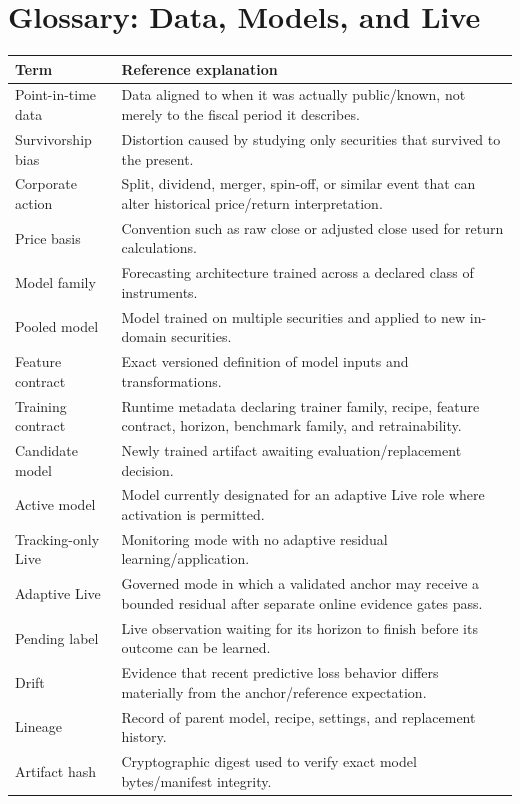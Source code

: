 \documentclass[11pt]{article}
\begin{document}
\section{Glossary: Data, Models, and Live}
\begin{longtable}{p{}p{}}
\toprule
Term & Reference explanation\\
\midrule
Point-in-time data & Data aligned to when it was actually public/known, not merely to the fiscal period it describes.\\
Survivorship bias & Distortion caused by studying only securities that survived to the present.\\
Corporate action & Split, dividend, merger, spin-off, or similar event that can alter historical price/return interpretation.\\
Price basis & Convention such as raw close or adjusted close used for return calculations.\\
Model family & Forecasting architecture trained across a declared class of instruments.\\
Pooled model & Model trained on multiple securities and applied to new in-domain securities.\\
Feature contract & Exact versioned definition of model inputs and transformations.\\
Training contract & Runtime metadata declaring trainer family, recipe, feature contract, horizon, benchmark family, and retrainability.\\
Candidate model & Newly trained artifact awaiting evaluation/replacement decision.\\
Active model & Model currently designated for an adaptive Live role where activation is permitted.\\
Tracking-only Live & Monitoring mode with no adaptive residual learning/application.\\
Adaptive Live & Governed mode in which a validated anchor may receive a bounded residual after separate online evidence gates pass.\\
Pending label & Live observation waiting for its horizon to finish before its outcome can be learned.\\
Drift & Evidence that recent predictive loss behavior differs materially from the anchor/reference expectation.\\
Lineage & Record of parent model, recipe, settings, and replacement history.\\
Artifact hash & Cryptographic digest used to verify exact model bytes/manifest integrity.\\
\bottomrule
\end{longtable}
\end{document}
